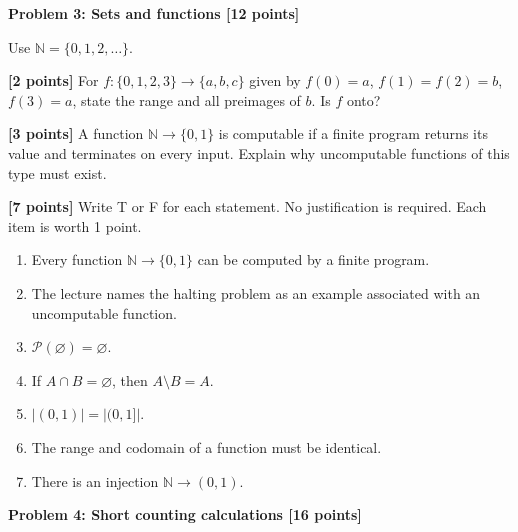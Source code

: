 \documentclass[12pt,letterpaper]{article}
\newcommand{\problemheading}[2][5\baselineskip]{\Needspace{#1}\par\noindent\hspace*{-0.625in}\textbf{#2}\par\nobreak\vspace{0.3em}}
\newcommand{\examspace}[1]{\par\vspace*{#1cm}}
\begin{document}
\clearpage
\vspace*{0.21in}
\problemheading{Problem 3: Sets and functions [12 points]}
\begin{list}{}{\setlength{\leftmargin}{0.25in}\setlength{\rightmargin}{0.25in}}\item[]
Use $\mathbb N=\{0,1,2,\ldots\}$.
\begin{description}[font=\normalfont,leftmargin=1.2em,labelsep=0.4em]
\item[(a)] \textbf{[2 points]} For $f:\{0,1,2,3\}\to\{a,b,c\}$ given by $f(0)=a$, $f(1)=f(2)=b$, $f(3)=a$, state the range and all preimages of $b$. Is $f$ onto?
\examspace{3}
\Needspace{\dimexpr 5cm+4\baselineskip\relax}
\item[(b)] \textbf{[3 points]} A function $\mathbb N\to\{0,1\}$ is computable if a finite program returns its value and terminates on every input. Explain why uncomputable functions of this type must exist.
\examspace{5}
\Needspace{\dimexpr 1cm+4\baselineskip\relax}
\item[(c)] \textbf{[7 points]} Write T or F for each statement. No justification is required. Each item is worth 1 point.\begin{enumerate}[label=(\roman*)]\item Every function $\mathbb N\to\{0,1\}$ can be computed by a finite program.\item The lecture names the halting problem as an example associated with an uncomputable function.\item $\mathcal P(\varnothing)=\varnothing$.\item If $A\cap B=\varnothing$, then $A\setminus B=A$.\item $|(0,1)|=|(0,1]|$.\item The range and codomain of a function must be identical.\item There is an injection $\mathbb N\to(0,1)$.\end{enumerate}
\examspace{1}
\end{description}
\end{list}
\clearpage
\vspace*{0.21in}
\problemheading{Problem 4: Short counting calculations [16 points]}
\end{document}
